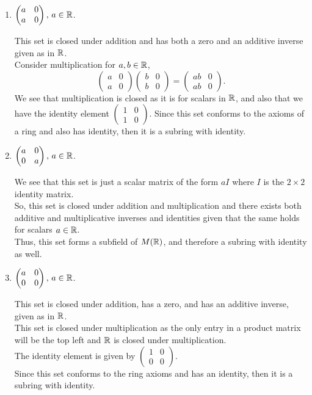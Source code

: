 \documentclass[../hw3]{subfiles}
\begin{document}
\begin{enumerate}[label=\alph*)]
	\item $\begin{pmatrix} a & 0 \\ a & 0 \end{pmatrix} ,\, a\in \mathbb{R}$.

	      This set is closed under addition and has both a zero and an additive inverse given as in $\mathbb{R}$. \\
	      Consider multiplication for $a,b\in \mathbb{R}$, \[
		      \begin{pmatrix} a & 0 \\ a & 0 \end{pmatrix} \begin{pmatrix} b & 0 \\ b & 0 \end{pmatrix} = \begin{pmatrix} ab & 0 \\ ab & 0 \end{pmatrix}
		      .\] We see that multiplication is closed as it is for scalars in $\mathbb{R}$, and also that we have the identity element $\begin{pmatrix} 1 & 0 \\ 1 & 0 \end{pmatrix} $.
	      Since this set conforms to the axioms of a ring and also has identity, then it is a subring with identity.

	\item $\begin{pmatrix} a & 0 \\ 0 & a \end{pmatrix},\, a\in \mathbb{R}$.

	      We see that this set is just a scalar matrix of the form $aI$ where  $I$ is the $2\times 2$ identity matrix. \\
	      So, this set is closed under addition and multiplication and there exists both additive and multiplicative inverses and identities given that the same holds for scalars $a\in \mathbb{R}$. \\
	      Thus, this set forms a subfield of $M(\mathbb{R})$, and therefore a subring with identity as well.

	\item $\begin{pmatrix} a & 0 \\ 0 & 0 \end{pmatrix} ,\, a\in \mathbb{R}$.

	      This set is closed under addition, has a zero, and has an additive inverse, given as in $\mathbb{R}$. \\
	      This set is closed under multiplication as the only entry in a product matrix will be the top left and $\mathbb{R}$ is closed under multiplication. \\
	      The identity element is given by $\begin{pmatrix} 1 & 0 \\ 0 & 0 \end{pmatrix} $. \\
	      Since this set conforms to the ring axioms and has an identity, then it is a subring with identity.

\end{enumerate}
\end{document}
